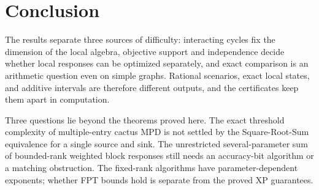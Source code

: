 \section{Conclusion}
\label{sec:main-conclusion}

The results separate three sources of difficulty: interacting cycles
fix the dimension of the local algebra, objective support and
independence decide whether local responses can be optimized
separately, and exact comparison is an arithmetic question even on
simple graphs. Rational scenarios, exact local states, and additive
intervals are therefore different outputs, and the certificates keep
them apart in computation.

Three questions lie beyond the theorems proved here. The exact threshold
complexity of multiple-entry cactus MPD is not settled by the
Square-Root-Sum equivalence for a single source and sink. The unrestricted
several-parameter sum of bounded-rank weighted block responses still
needs an accuracy-bit algorithm or a matching obstruction. The fixed-rank
algorithms have parameter-dependent exponents; whether FPT bounds hold
is separate from the proved XP guarantees.
